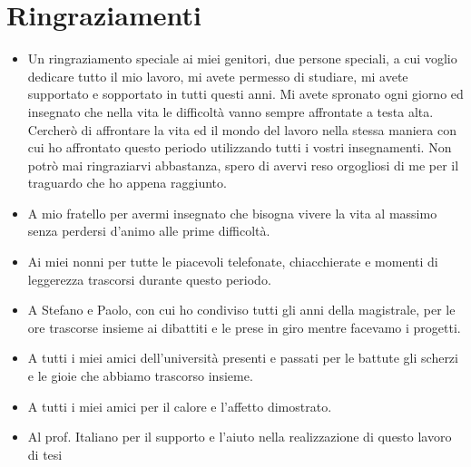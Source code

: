 \chapter*{Ringraziamenti}

\begin{itemize}
\item Un ringraziamento speciale ai miei genitori, due persone speciali,  a cui voglio dedicare tutto il mio lavoro, mi avete permesso di studiare, mi avete supportato e sopportato in tutti questi anni. Mi avete spronato ogni giorno ed insegnato che nella vita le difficoltà vanno sempre affrontate a testa alta. Cercherò di affrontare la vita ed il mondo del lavoro nella stessa maniera con cui ho affrontato questo periodo utilizzando tutti i vostri insegnamenti. Non potrò mai ringraziarvi abbastanza, spero di avervi reso orgogliosi di me per il traguardo che ho appena raggiunto.

\item A mio fratello per avermi insegnato che bisogna vivere la vita al massimo senza perdersi d'animo alle prime difficoltà.


\item Ai miei nonni per tutte le piacevoli telefonate, chiacchierate e momenti di leggerezza trascorsi durante questo periodo.

\item A Stefano e Paolo, con cui ho condiviso tutti gli anni della magistrale, per le ore trascorse insieme ai dibattiti  e le prese in giro mentre facevamo i progetti.

\item A tutti i miei amici dell'università presenti e passati per le battute gli scherzi e le gioie che abbiamo trascorso insieme.

\item A tutti i miei amici per il calore e l'affetto dimostrato.

\item Al prof. Italiano per il supporto e l'aiuto nella realizzazione di questo lavoro di tesi
\end{itemize}

